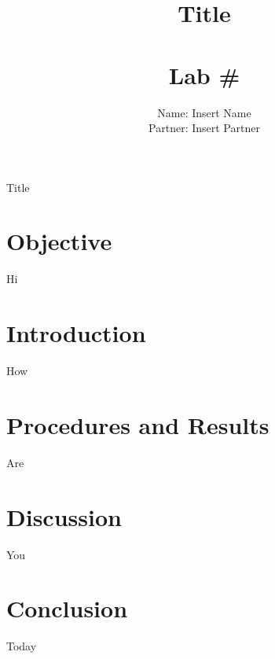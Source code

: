 \documentclass[11pt, titlepage, letterpaper, twoside]{article}
\title{\textbf{Title} \\ \ \\ \large Lab \# }
\author{Name: Insert Name \\ Partner: Insert Partner}
\date{}
\begin{document}
\maketitle

\begin{center}
\LARGE Title
\end{center}

\section*{Objective}
Hi

\section{Introduction}
How

\section{Procedures and Results}
Are

\section{Discussion}
You

\section{Conclusion}
Today
\end{document}
